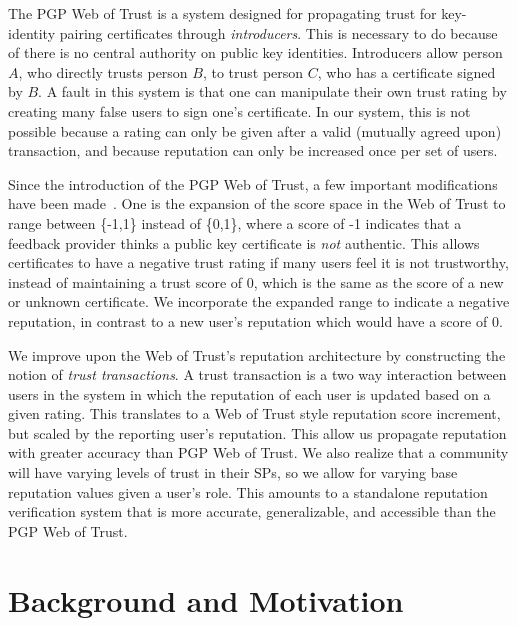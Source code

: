\documentclass[letterpaper,twocolumn,10pt]{article}
\begin{document}
The PGP Web of Trust is a system designed for propagating trust for key-identity pairing certificates through \textit{introducers}. This is necessary to do because of there is no central authority on public key identities. Introducers allow person $A$, who directly trusts person $B$, to trust person $C$, who has a certificate signed by $B$. A fault in this system is that one can manipulate their own trust rating by creating many false users to sign one's certificate. In our system, this is not possible because a rating can only be given after a valid (mutually agreed upon) transaction, and because reputation can only be increased once per set of users.

Since the introduction of the PGP Web of Trust, a few important modifications have been made~\cite{ImprovingPGPWebTrust}. One is the expansion of the score space in the Web of Trust to range between \{-1,1\} instead of \{0,1\}, where a score of -1 indicates that a feedback provider thinks a public key certificate is \textit{not} authentic. This allows certificates to have a negative trust rating if many users feel it is not trustworthy, instead of maintaining a trust score of 0, which is the same as the score of a new or unknown certificate. We incorporate the expanded range to indicate a negative reputation, in contrast to a new user's reputation which would have a score of 0.

We improve upon the Web of Trust's reputation architecture by constructing the notion of \textit{trust transactions}. A trust transaction is a two way interaction between users in the system in which the reputation of each user is updated based on a given rating. This translates to a Web of Trust style reputation score increment, but scaled by the reporting user's reputation. This allow us propagate reputation with greater accuracy than PGP Web of Trust. We also realize that a community will have varying levels of trust in their SPs, so we allow for varying base reputation values given a user's role. This amounts to a standalone reputation verification system that is more accurate, generalizable, and accessible than the PGP Web of Trust.

\section{Background and Motivation}
\end{document}
